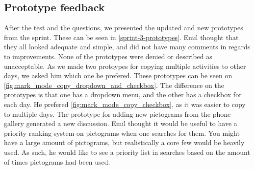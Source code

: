 \subsection{Prototype feedback}
After the test and the questions, we presented the updated and new prototypes from the sprint.
These can be seen in \autoref{sprint-3-prototypes}.
Emil thought that they all looked adequate and simple, and did not have many comments in regards to improvements.
None of the prototypes were denied or described as unacceptable.
As we made two protoypes for copying multiple activities to other days, we asked him which one he prefered.
These prototypes can be seen on \autoref{fig:mark_mode_copy_dropdown_and_checkbox}.
The difference on the prototypes is that one has a dropdown menu, and the other has a checkbox for each day.
He prefered \autoref{fig:mark_mode_copy_checkbox}, as it was easier to copy to multiple days.
The prototype for adding new pictograms from the phone gallery generated a new discussion.
Emil thought it would be useful to have a priority ranking system on pictograms when one searches for them.
You might have a large amount of pictograms, but realistically a core few would be heavily used.
As such, he would like to see a priority list in searches based on the amount of times pictograms had been used.
